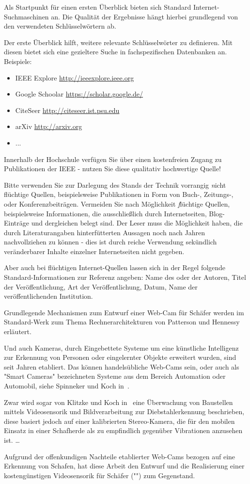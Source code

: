 Als Startpunkt für einen ersten Überblick bieten sich Standard Internet-Suchmaschinen an. Die Qualität der Ergebnisse hängt hierbei grundlegend von den verwendeten Schlüsselwörtern ab. 

Der erste Überblick hilft, weitere relevante Schlüsselwörter zu definieren. Mit diesen bietet sich eine gezieltere Suche in fachspezifischen Datenbanken an. Beispiele:

\begin{itemize}
\item IEEE Explore \url{http://ieeexplore.ieee.org}
\item Google Schoolar \url{https://scholar.google.de/}
\item CiteSeer \url{http://citeseer.ist.psu.edu}
\item arXiv \url{http://arxiv.org}
\item ...
\end{itemize}

Innerhalb der Hochschule verfügen Sie über einen kostenfreien Zugang zu Publikationen der IEEE - nutzen Sie diese qualitativ hochwertige Quelle! 

Bitte verwenden Sie zur Darlegung des Stands der Technik vorrangig {\emph nicht flüchtige Quellen}, beispielsweise Publikationen in Form von Buch-, Zeitungs-, oder Konferenzbeiträgen.
Vermeiden Sie nach Möglichkeit {\emph flüchtige Quellen}, beispielsweise Informationen, die ausschließlich durch Internetseiten, Blog-Einträge und dergleichen belegt sind. Der Leser muss die Möglichkeit haben, die durch Literaturangaben hinterfütterten Aussagen noch nach Jahren nachvollziehen zu können - dies ist durch reiche Verwendung sekündlich veränderbarer Inhalte einzelner Internetseiten nicht gegeben.

Aber auch bei flüchtigen Internet-Quellen lassen sich in der Regel folgende Standard-Informationen zur Referenz angeben: Name des oder der Autoren, Titel der Veröffentlichung, Art der Veröffentlichung, Datum, Name der veröffentlichenden Institution.

\example Grundlegende Mechanismen zum Entwurf einer Web-Cam für Schäfer werden im Standard-Werk zum Thema Rechnerarchitekturen von Patterson und Hennessy~\cite{patterson2005} erläutert. 

Und auch Kameras, durch Eingebettete Systeme um eine künstliche Intelligenz zur Erkennung von Personen oder eingelernter Objekte erweitert wurden, sind seit Jahren etabliert.
Das können handelsübliche Web-Cams sein, oder auch als "Smart Cameras" bezeichneten Systeme aus dem Bereich Automation oder Automobil, siehe Spinneker und Koch in~\cite{spinneker2014}.

Zwar wird sogar von Klitzke und Koch in~\cite{klitzke2016} eine Überwachung von Baustellen mittels Videosensorik und Bildverarbeitung zur Diebstahlerkennung beschrieben, diese basiert jedoch auf einer kalibrierten Stereo-Kamera, die für den mobilen Einsatz in einer Schafherde als zu empfindlich gegenüber Vibrationen anzusehen ist.
\dots

Aufgrund der offenkundigen Nachteile etablierter Web-Cams bezogen auf eine Erkennung von Schafen, hat diese Arbeit den Entwurf und die Realisierung einer kostengünstigen Videosensorik für Schäfer ("") zum Gegenstand.


